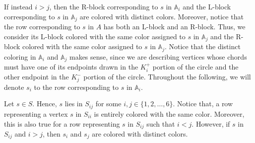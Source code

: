 \documentclass[12pt]{book}
\theoremstyle{plain}
\theoremstyle{remark}
\begin{document}
If instead $i >j$, then the R-block corresponding to $s$ in $\mathbb A_i$ and the L-block corresponding to $s$ in $\mathbb A_j$ are colored with distinct colors. Moreover, notice that the row corresponding to $s$ in $A$ has both an L-block and an R-block. Thus, we consider its L-block colored with the same color assigned to $s$ in $\mathbb A_j$ and the R-block colored with the same color assigned to $s$ in $\mathbb A_j$.
Notice that the distinct coloring in $\mathbb A_i$ and $\mathbb A_j$ makes sense, since we are describing vertices whose chords must have one of its endpoints drawn in the $K_i^+$ portion of the circle and the other endpoint in the $K_j^-$ portion of the circle. %
Throughout the following, we will denote $s_i$ to the row corresponding to $s$ in $\mathbb A_i$.


Let $s \in S$. Hence, $s$ lies in $S_{ij}$ for some $i,j\in \{1,2,\ldots,6\}$. Notice that, a row representing a vertex $s$ in $S_{ii}$ is entirely colored with the same color. Moreover, this is also true for a row representing $s$ in $S_{ij}$ such that $i<j$. However, if $s$ in $S_{ij}$ and $i>j$, then $s_i$ and $s_j$ are colored with distinct colors.
\end{document}
